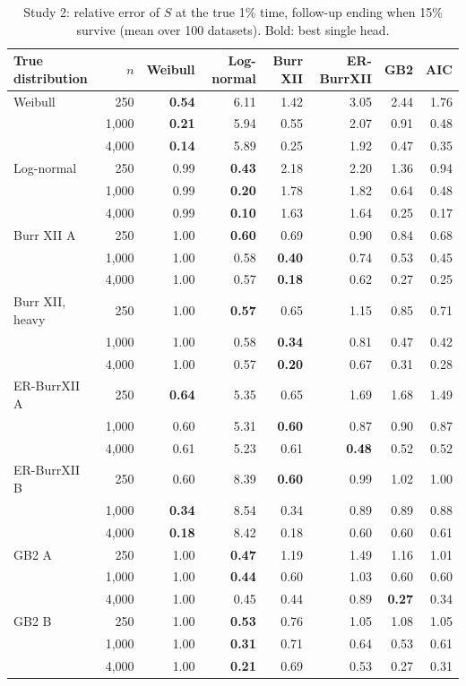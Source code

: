 \begin{table}[htbp]
\centering
\caption{Study 2: relative error of $S$ at the true 1\% time, follow-up ending when 15\% survive (mean over 100 datasets). Bold: best single head.}\label{stab:misspec_tail_admin15}
\small
\begin{tabular}{lrrrrrrr}
\toprule
True distribution & $n$ & Weibull & Log-normal & Burr XII & ER-BurrXII & GB2 & AIC \\
\midrule
Weibull & 250 & \textbf{0.54} & 6.11 & 1.42 & 3.05 & 2.44 & 1.76 \\
 & 1,000 & \textbf{0.21} & 5.94 & 0.55 & 2.07 & 0.91 & 0.48 \\
 & 4,000 & \textbf{0.14} & 5.89 & 0.25 & 1.92 & 0.47 & 0.35 \\
Log-normal & 250 & 0.99 & \textbf{0.43} & 2.18 & 2.20 & 1.36 & 0.94 \\
 & 1,000 & 0.99 & \textbf{0.20} & 1.78 & 1.82 & 0.64 & 0.48 \\
 & 4,000 & 0.99 & \textbf{0.10} & 1.63 & 1.64 & 0.25 & 0.17 \\
Burr XII A & 250 & 1.00 & \textbf{0.60} & 0.69 & 0.90 & 0.84 & 0.68 \\
 & 1,000 & 1.00 & 0.58 & \textbf{0.40} & 0.74 & 0.53 & 0.45 \\
 & 4,000 & 1.00 & 0.57 & \textbf{0.18} & 0.62 & 0.27 & 0.25 \\
Burr XII, heavy & 250 & 1.00 & \textbf{0.57} & 0.65 & 1.15 & 0.85 & 0.71 \\
 & 1,000 & 1.00 & 0.58 & \textbf{0.34} & 0.81 & 0.47 & 0.42 \\
 & 4,000 & 1.00 & 0.57 & \textbf{0.20} & 0.67 & 0.31 & 0.28 \\
ER-BurrXII A & 250 & \textbf{0.64} & 5.35 & 0.65 & 1.69 & 1.68 & 1.49 \\
 & 1,000 & 0.60 & 5.31 & \textbf{0.60} & 0.87 & 0.90 & 0.87 \\
 & 4,000 & 0.61 & 5.23 & 0.61 & \textbf{0.48} & 0.52 & 0.52 \\
ER-BurrXII B & 250 & 0.60 & 8.39 & \textbf{0.60} & 0.99 & 1.02 & 1.00 \\
 & 1,000 & \textbf{0.34} & 8.54 & 0.34 & 0.89 & 0.89 & 0.88 \\
 & 4,000 & \textbf{0.18} & 8.42 & 0.18 & 0.60 & 0.60 & 0.61 \\
GB2 A & 250 & 1.00 & \textbf{0.47} & 1.19 & 1.49 & 1.16 & 1.01 \\
 & 1,000 & 1.00 & \textbf{0.44} & 0.60 & 1.03 & 0.60 & 0.60 \\
 & 4,000 & 1.00 & 0.45 & 0.44 & 0.89 & \textbf{0.27} & 0.34 \\
GB2 B & 250 & 1.00 & \textbf{0.53} & 0.76 & 1.05 & 1.08 & 1.05 \\
 & 1,000 & 1.00 & \textbf{0.31} & 0.71 & 0.64 & 0.53 & 0.61 \\
 & 4,000 & 1.00 & \textbf{0.21} & 0.69 & 0.53 & 0.27 & 0.31 \\
\bottomrule
\end{tabular}
\end{table}
